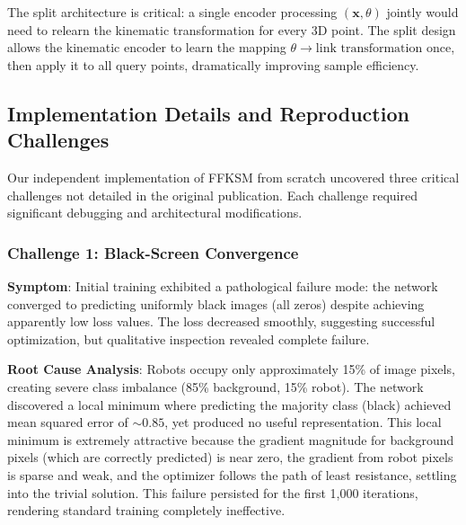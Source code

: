 \documentclass[12pt,a4paper,oneside]{report}
\begin{document}
The split architecture is critical: a single encoder processing $(\mathbf{x}, \theta)$ jointly would need to relearn the kinematic transformation for every 3D point. The split design allows the kinematic encoder to learn the mapping $\theta \rightarrow \text{link transformation}$ once, then apply it to all query points, dramatically improving sample efficiency.

\subsection{Implementation Details and Reproduction Challenges}
Our independent implementation of FFKSM from scratch uncovered three critical challenges not detailed in the original publication. Each challenge required significant debugging and architectural modifications.

\subsubsection{Challenge 1: Black-Screen Convergence}
\label{subsubsec:challenge_1_black_screen_convergence}
\textbf{Symptom}: Initial training exhibited a pathological failure mode: the network converged to predicting uniformly black images (all zeros) despite achieving apparently low loss values. The loss decreased smoothly, suggesting successful optimization, but qualitative inspection revealed complete failure.

\textbf{Root Cause Analysis}: Robots occupy only approximately 15\% of image pixels, creating severe class imbalance (85\% background, 15\% robot). The network discovered a local minimum where predicting the majority class (black) achieved mean squared error of $\sim 0.85$, yet produced no useful representation. This local minimum is extremely attractive because the gradient magnitude for background pixels (which are correctly predicted) is near zero, the gradient from robot pixels is sparse and weak, and the optimizer follows the path of least resistance, settling into the trivial solution. This failure persisted for the first 1,000 iterations, rendering standard training completely ineffective.
\end{document}
